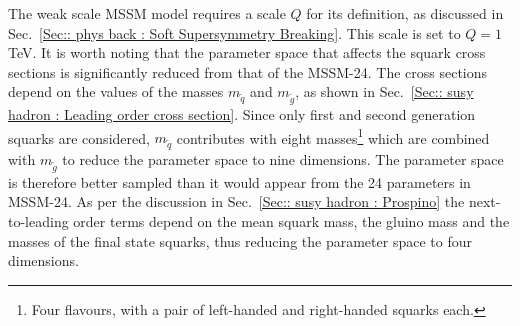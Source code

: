 \documentclass[twoside,english]{uiofysmaster}
\begin{document}
{{The weak scale MSSM model requires a scale $Q$ for its definition, as discussed in Sec.~\ref{Sec:: phys back : Soft Supersymmetry Breaking}. This scale is set to $Q=1$ TeV. It is worth noting that the parameter space that affects the squark cross sections is significantly reduced from that of the MSSM-24. The cross sections depend on the values of the masses $m_{\widetilde{q}}$ and $m_{\widetilde{g}}$, as shown in Sec.~\ref{Sec:: susy hadron : Leading order cross section}. Since only first and second generation squarks are considered, $m_{\widetilde{q}}$ contributes with eight masses\footnote{Four flavours, with a pair of left-handed and right-handed squarks each.} which are combined with $m_{\widetilde{g}}$ to reduce the parameter space to nine dimensions. The parameter space is therefore better sampled than it would appear from the 24 parameters in MSSM-24. As per the discussion in Sec.~\ref{Sec:: susy hadron : Prospino} the next-to-leading order terms depend on the mean squark mass, the gluino mass and the masses of the final state squarks, thus reducing the parameter space to four dimensions.

}}
\end{document}
